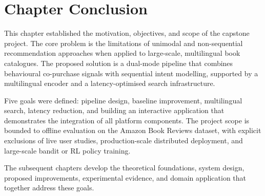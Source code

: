 \section{Chapter Conclusion}

This chapter established the motivation, objectives, and scope of the capstone project.
The core problem is the limitations of unimodal and non-sequential recommendation approaches when applied to large-scale, multilingual book catalogues.
The proposed solution is a dual-mode pipeline that combines behavioural co-purchase signals with sequential intent modelling, supported by a multilingual encoder and a latency-optimised search infrastructure.

Five goals were defined: pipeline design, baseline improvement, multilingual search, latency reduction, and building an interactive application that demonstrates the integration of all platform components.
The project scope is bounded to offline evaluation on the Amazon Book Reviews dataset, with explicit exclusions of live user studies, production-scale distributed deployment, and large-scale bandit or RL policy training.

The subsequent chapters develop the theoretical foundations, system design, proposed improvements, experimental evidence, and domain application that together address these goals.

